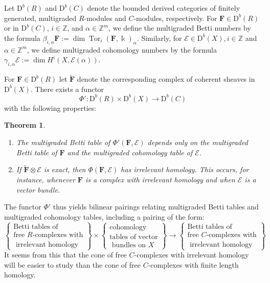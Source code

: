\documentclass[12pt]{amsart}
\newtheorem{theorem}[lemma]{Theorem}
\theoremstyle{definition}
\theoremstyle{remark}
\newcommand{\Tor}{\operatorname{Tor}}
\newcommand{\kk}{\Bbbk}
\newcommand{\ZZ}{\mathbb{Z}}
\newcommand{\cE}{\mathcal{E}}
\newcommand{\FF}{\mathbf{F}}
\newcommand{\DD}{\mathrm{D}}
\begin{document}
Let $\DD^b(R)$ and $\DD^b(C)$ denote the bounded derived categories of finitely generated, multigraded $R$-modules and $C$-modules, respectively.   For $\FF\in \DD^b(R)$ or in $\DD^b(C)$, $i\in \ZZ$, and $\alpha\in \ZZ^m$, we define the multigraded Betti numbers by the formula $\beta_{i,\alpha} \FF:=\dim \Tor_i(\FF,\kk)_{\alpha}$.  Similarly, for $\cE\in \DD^b(X), i\in \ZZ$ and $\alpha\in \ZZ^m$, we define multigraded cohomology numbers by the formula $\gamma_{i,\alpha} \cE:=\dim H^i(X, \cE(\alpha))$.  


For  $\FF\in \DD^b(R)$ let $\widetilde{\FF}$ denote the corresponding complex of coherent sheaves in $\DD^b(X)$.  There exists a functor
\[
\Phi': \DD^b(R)\times \DD^b(X)\to \DD^b(C)
\]
with the following properties:
\begin{theorem}\label{thm:Phimulti}
\begin{enumerate}
	\item\label{thm:Phi':1}  The multigraded Betti table of $\Phi'(\FF,\cE)$ depends only on the multigraded Betti table of $\FF$ and the multigraded cohomology table of $\cE$.
	\item\label{thm:Phi':2}  If $\widetilde{\FF}\otimes \cE$ is exact, then $\Phi(\FF,\cE)$ has irrelevant homology.  This occurs, for instance, whenever $\FF$ is a complex with irrelevant homology and when $\cE$ is a vector bundle.
\end{enumerate}
\end{theorem}



The functor $\Phi'$ thus yields bilinear pairings relating multigraded Betti tables and multigraded cohomology tables, including a pairing of the form:
\begin{equation*}%
\label{eqn:multipairing}
%
\left\{\begin{matrix}
\text{Betti tables of} \\ \text{free $R$-complexes with}\\
\text{  irrelevant homology}\end{matrix}\right\}
%
\times 
%
\left\{\begin{matrix}
\text{cohomology }\\
\text{tables of vector}\\
\text{ bundles on } X
\end{matrix}\right\}
%
\longrightarrow
\left\{\begin{matrix}
\text{Betti tables of} \\ \text{free $C$-complexes with}\\
\text{  irrelevant homology}
\end{matrix}\right\}
\end{equation*}
It seems from this that the cone of free $C$-complexes with irrelevant homology will be easier to study than the cone of free $C$-complexes with finite length homology.  
\end{document}
